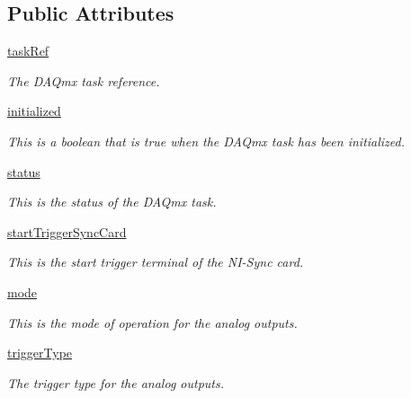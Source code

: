 \subsection*{Public Attributes}
\begin{DoxyCompactItemize}
\item 
\hyperlink{class_chassis_8git_1_1_analog_output_1_1_analog_output_a85213a49732be73c70723a37e03e9c5b}{task\-Ref}
\begin{DoxyCompactList}\small\item\em The D\-A\-Qmx task reference. \end{DoxyCompactList}\item 
\hyperlink{class_chassis_8git_1_1_analog_output_1_1_analog_output_a00be43ede9819a99e9b7d093c88278d1}{initialized}
\begin{DoxyCompactList}\small\item\em This is a boolean that is true when the D\-A\-Qmx task has been initialized. \end{DoxyCompactList}\item 
\hyperlink{class_chassis_8git_1_1_analog_output_1_1_analog_output_ae2a69d59152cb45ae0875a42ab203efd}{status}
\begin{DoxyCompactList}\small\item\em This is the status of the D\-A\-Qmx task. \end{DoxyCompactList}\item 
\hyperlink{class_chassis_8git_1_1_analog_output_1_1_analog_output_adf297d1ff53368377985602e6a37faff}{start\-Trigger\-Sync\-Card}
\begin{DoxyCompactList}\small\item\em This is the start trigger terminal of the N\-I-\/\-Sync card. \end{DoxyCompactList}\item 
\hyperlink{class_chassis_8git_1_1_analog_output_1_1_analog_output_a296d34f273903586b812eea08f6f5e1e}{mode}
\begin{DoxyCompactList}\small\item\em This is the mode of operation for the analog outputs. \end{DoxyCompactList}\item 
\hyperlink{class_chassis_8git_1_1_analog_output_1_1_analog_output_ad8b0482efeef548c4443affd2957fbdb}{trigger\-Type}
\begin{DoxyCompactList}\small\item\em The trigger type for the analog outputs. \end{DoxyCompactList}\item 

\end{DoxyCompactItemize}
